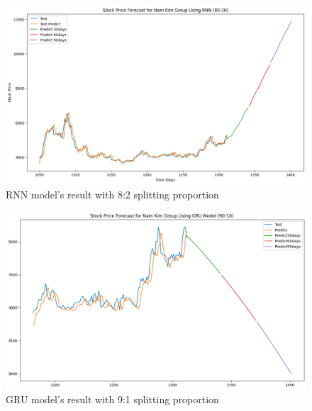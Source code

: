 \documentclass{ieeeojies}
\begin{document}
\begin{figure}[H]
  \centering
  \begin{minipage}{0.8\linewidth}
    \centering
    \includegraphics[width=\linewidth]{bibliography/RNN_NKG.png}
    \caption{RNN model's result with 8:2 splitting proportion}
    \label{fig26}
  \end{minipage}
\end{figure}
\begin{figure}[H]
  \centering
  \begin{minipage}{0.8\linewidth}
    \centering
        \includegraphics[width=\linewidth]{bibliography/GRU_NKG_90-10.png}
    \caption{GRU model's result with 9:1 splitting proportion}
    \label{fig27}
  \end{minipage}
\end{figure}
\end{document}
